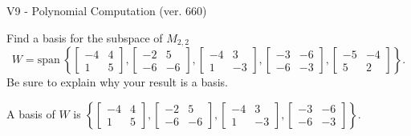 \begin{exercise}
  \begin{exerciseTitle}V9 - Polynomial Computation (ver. 660)\end{exerciseTitle}
  \begin{exerciseStatement}
    Find a basis for the subspace of \(M_{2,2}\) 
\[W=\mathrm{span}\ \left\{\left[\begin{array}{cc}
-4 & 4 \\
1 & 5
\end{array}\right] , \left[\begin{array}{cc}
-2 & 5 \\
-6 & -6
\end{array}\right] , \left[\begin{array}{cc}
-4 & 3 \\
1 & -3
\end{array}\right] , \left[\begin{array}{cc}
-3 & -6 \\
-6 & -3
\end{array}\right] , \left[\begin{array}{cc}
-5 & -4 \\
5 & 2
\end{array}\right]\right\}.\]
 Be sure to explain why your result is a basis.


  \end{exerciseStatement}
  \begin{exerciseAnswer}
   A basis of \(W\) is  \(\left\{\left[\begin{array}{cc}
-4 & 4 \\
1 & 5
\end{array}\right] , \left[\begin{array}{cc}
-2 & 5 \\
-6 & -6
\end{array}\right] , \left[\begin{array}{cc}
-4 & 3 \\
1 & -3
\end{array}\right] , \left[\begin{array}{cc}
-3 & -6 \\
-6 & -3
\end{array}\right]\right\}\).
  


  \end{exerciseAnswer}
\end{exercise}